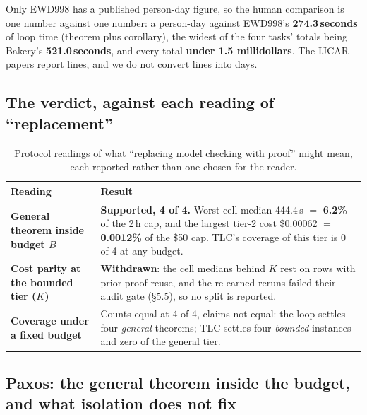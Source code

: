 \documentclass[11pt,a4paper]{article}
\begin{document}
\noindent
Only EWD998 has a published person-day figure, so the human comparison is one number against one
number: a person-day against EWD998's \textbf{274.3\,seconds} of loop time (theorem plus corollary),
the widest of the four tasks' totals being Bakery's \textbf{521.0\,seconds}, and every total
\textbf{under 1.5 millidollars}. The IJCAR papers report lines, and we do not convert lines into days.

\subsection{The verdict, against each reading of ``replacement''}

\begin{table}[htbp]
\centering
\small
\begin{tabular}{@{}>{\raggedright\arraybackslash}p{}>{\raggedright\arraybackslash}p{}@{}}
\toprule
Reading & Result \\
\midrule
\textbf{General theorem inside budget $B$} &
\textbf{Supported, 4 of 4.} Worst cell median 444.4\,s $=$ \textbf{6.2\%} of the 2\,h cap, and the
largest tier-2 cost \$0.00062 $=$ \textbf{0.0012\%} of the \$50 cap. TLC's coverage of this tier is
0 of 4 at any budget. \\
\addlinespace
\textbf{Cost parity at the bounded tier ($K$)} &
\textbf{Withdrawn}: the cell medians behind $K$ rest on rows with prior-proof reuse, and the re-earned
reruns failed their audit gate (\S5.5), so no split is reported. \\
\addlinespace
\textbf{Coverage under a fixed budget} &
Counts equal at 4 of 4, claims not equal: the loop settles four \emph{general} theorems; TLC settles
four \emph{bounded} instances and zero of the general tier. \\
\bottomrule
\end{tabular}
\caption{Protocol readings of what ``replacing model checking with proof'' might mean, each reported
rather than one chosen for the reader.}
\end{table}

\subsection{Paxos: the general theorem inside the budget, and what isolation does not fix}
\end{document}
